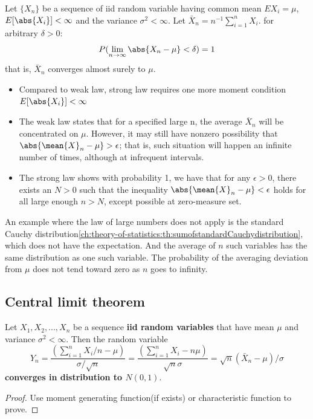 \begin{refsection}
\begin{theorem}\label{ch:theory-of-probability:th:stronglawlargenumber}
\cite[235]{casella2002statistical}Let $\{X_n\}$ be a sequence of iid random variable having common mean $EX_i = \mu$,$E[\abs{X_i}] < \infty$ and the variance $\sigma^2 < \infty$. Let $\bar{X}_n = n^{-1}\sum_{i=1}^n X_i$. for arbitrary $\delta > 0$:
$$P(\lim_{n\rightarrow \infty }\abs{X_n - \mu}<\delta) = 1$$
that is, $\bar{X}_n$ converges almost surely to $\mu$.
\end{theorem}



\begin{remark}[discussion]\hfill
\begin{itemize}
    \item Compared to weak law, strong law requires one more moment condition 
    $E[\abs{X_i}] < \infty$
    \item The weak law states that for a specified large n, the average $\overline{X}_{n}$ will be concentrated on $\mu$. However, it may still have nonzero possibility that $\abs{\mean{X}_n - \mu} > \epsilon$; that is, such situation will  happen an infinite number of times, although at infrequent intervals.
    \item The strong law shows with probability 1, we have that for any $\epsilon > 0$, there exists an $N > 0$ such that the inequality $\abs{\mean{X}_n - \mu} < \epsilon$ holds for all large enough $n > N$, except possible at zero-measure set.
\end{itemize}
\end{remark}

\begin{remark}
	An example where the law of large numbers does not apply is the standard Cauchy distribution\autoref{ch:theory-of-statistics:th:sumofstandardCauchydistribution}, which does not have the expectation. And the average of $n$ such variables has the same distribution as one such variable. The probability of the averaging deviation from $\mu$ does not tend toward zero as $n$ goes to infinity.	
\end{remark}



\subsection{Central limit theorem}
\begin{theorem}\cite[236]{casella2002statistical}\cite[313]{hoggintroduction}\label{ch:theory-of-probability:centralLimitTheorem}
Let $X_1,X_2,...,X_n$ be a sequence \textbf{iid random variables} that have mean $\mu$ and variance $\sigma^2 < \infty$. Then the random variable $$Y_n = \frac{(\sum_{i=1}^n X_i/n - \mu)}{\sigma/\sqrt{n}}= \frac{(\sum_{i=1}^n X_i - n\mu)}{\sqrt{n}\sigma} = \sqrt{n}(\bar{X}_n - \mu)/\sigma$$
\textbf{converges in distribution to $N(0,1)$}.
\end{theorem}
\begin{proof}
Use moment generating function(if exists) or characteristic function to prove.


\end{proof}
\end{refsection}
